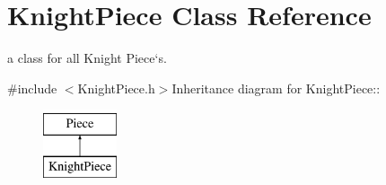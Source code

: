 \hypertarget{classKnightPiece}{
\section{KnightPiece Class Reference}
\label{classKnightPiece}
}


a class for all Knight Piece`s.  


{\ttfamily \#include $<$KnightPiece.h$>$}Inheritance diagram for KnightPiece::\begin{figure}[H]
\begin{center}
\leavevmode
\includegraphics[height=2cm]{classKnightPiece}
\end{center}
\end{figure}
